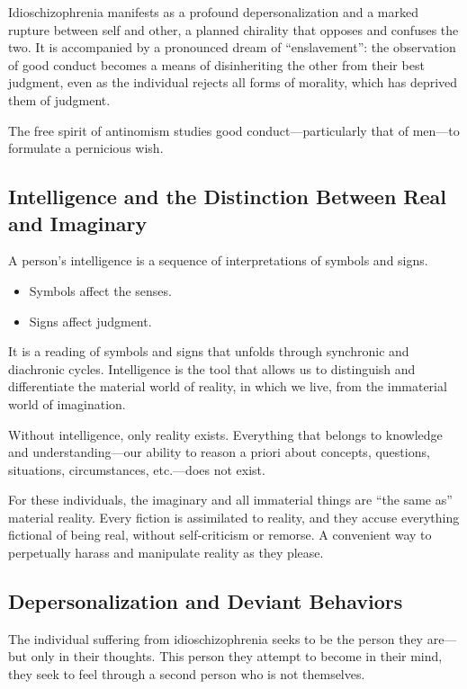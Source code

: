\documentclass[12pt,oneside]{article}
\begin{document}
Idioschizophrenia manifests as a profound depersonalization and a marked rupture between self and other, a planned chirality that opposes and confuses the two. It is accompanied by a pronounced dream of “enslavement”: the observation of good conduct becomes a means of disinheriting the other from their best judgment, even as the individual rejects all forms of morality, which has deprived them of judgment.

The free spirit of antinomism studies good conduct—particularly that of men—to formulate a pernicious wish.

\subsection{Intelligence and the Distinction Between Real and Imaginary}

A person’s intelligence is a sequence of interpretations of symbols and signs.

\begin{itemize}
    \item Symbols affect the senses.
    \item Signs affect judgment.
\end{itemize}

It is a reading of symbols and signs that unfolds through synchronic and diachronic cycles. Intelligence is the tool that allows us to distinguish and differentiate the material world of reality, in which we live, from the immaterial world of imagination.

Without intelligence, only reality exists. Everything that belongs to knowledge and understanding—our ability to reason a priori about concepts, questions, situations, circumstances, etc.—does not exist.

For these individuals, the imaginary and all immaterial things are “the same as” material reality. Every fiction is assimilated to reality, and they accuse everything fictional of being real, without self‑criticism or remorse. A convenient way to perpetually harass and manipulate reality as they please.

\subsection{Depersonalization and Deviant Behaviors}

The individual suffering from idioschizophrenia seeks to be the person they are—but only in their thoughts. This person they attempt to become in their mind, they seek to feel through a second person who is not themselves.
\end{document}
